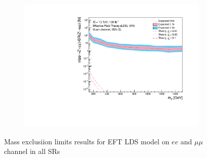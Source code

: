 \documentclass[12pt, a4paper]{book}
\begin{document}
\begin{figure}[!ht]
\begin{subfigure}[b]{0.49\textwidth}
   \end{subfigure}
   \hfill
   \begin{subfigure}[b]{0.49\textwidth}
      \centering
      \includegraphics[width=1\textwidth]{Limits/Model_independent/150/EFT_LDS/mass_exclusion_uu.pdf}
   \end{subfigure}
   \caption{Mass exclusiion limits results for EFT LDS model on $ee$ and $\mu\mu$ channel in all SRs}\label{fig:EFT_LDS_me_SRS}
\end{figure}
\end{document}
